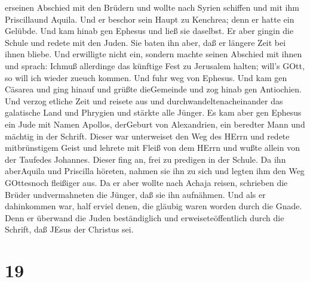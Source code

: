 erseinen Abschied mit den Brüdern und wollte nach Syrien schiffen und
mit ihm Priscillaund Aquila. Und er beschor sein Haupt zu Kenchrea; denn
er hatte ein Gelübde.  Und kam hinab gen Ephesus und ließ
sie daselbst. Er aber gingin die Schule und redete mit den Juden.
 Sie baten ihn aber, daß er längere Zeit bei ihnen bliebe.
Und erwilligte nicht ein,  sondern machte seinen Abschied
mit ihnen und sprach: Ichmuß allerdinge das künftige Fest zu Jerusalem
halten; will's GOtt, so will ich wieder zueuch kommen. Und fuhr weg von
Ephesus.  Und kam gen Cäsarea und ging hinauf und grüßte
dieGemeinde und zog hinab gen Antiochien.  Und verzog
etliche Zeit und reisete aus und durchwandeltenacheinander das
galatische Land und Phrygien und stärkte alle Jünger.  Es
kam aber gen Ephesus ein Jude mit Namen Apollos, derGeburt von
Alexandrien, ein beredter Mann und mächtig in der Schrift. 
Dieser war unterweiset den Weg des HErrn und redete mitbrünstigem Geist
und lehrete mit Fleiß von dem HErrn und wußte allein von der Taufedes
Johannes.  Dieser fing an, frei zu predigen in der Schule.
Da ihn aberAquila und Priscilla höreten, nahmen sie ihn zu sich und
legten ihm den Weg GOttesnoch fleißiger aus.  Da er aber
wollte nach Achaja reisen, schrieben die Brüder undvermahneten die
Jünger, daß sie ihn aufnähmen. Und als er dahinkommen war, half erviel
denen, die gläubig waren worden durch die Gnade.  Denn er
überwand die Juden beständiglich und erweiseteöffentlich durch die
Schrift, daß JEsus der Christus sei.

\hypertarget{section-18}{%
\section{19}\label{section-18}}

